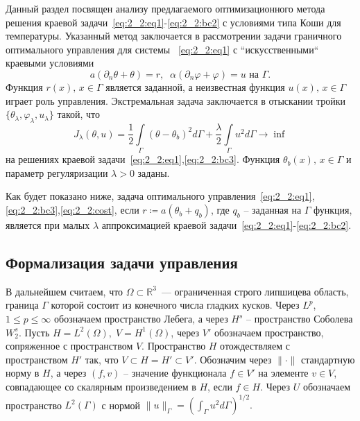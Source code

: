 Данный раздел посвящен анализу предлагаемого
оптимизационного метода решения краевой задачи~\eqref{eq:2_2:eq1}-\eqref{eq:2_2:bc2}
с условиями типа Коши для температуры.
Указанный метод заключается в рассмотрении задачи
граничного оптимального управления для
системы ~\eqref{eq:2_2:eq1} с ``искусственными`` краевыми условиями
\begin{equation}
    \label{eq:2_2:bc3}
    a(\partial_n\theta+\theta) = r,\;\;
    \alpha(\partial_n\varphi+\varphi) = u \text{ на }\Gamma.
\end{equation}
Функция $r(x),\, x\in\Gamma$ является заданной, а неизвестная функция $u(x),\, x\in\Gamma$
играет роль управления.
Экстремальная задача заключается в отыскании
тройки $\{\theta_\lambda,\varphi_\lambda,u_\lambda\}$
такой, что
\begin{equation}
    \label{eq:2_2:cost}
    J_\lambda(\theta, u) = \frac{1}{2}\int\limits_\Gamma (\theta - \theta_b)^2 d\Gamma
    + \frac{\lambda}{2}\int\limits_\Gamma u^2 d\Gamma \rightarrow\inf
\end{equation}
на решениях краевой задачи~\eqref{eq:2_2:eq1},\eqref{eq:2_2:bc3}.
Функция $\theta_b(x),\, x\in\Gamma$  и параметр регуляризации $\lambda>0$ заданы.

Как будет показано ниже, задача оптимального
управления~\eqref{eq:2_2:eq1}, \eqref{eq:2_2:bc3},\eqref{eq:2_2:cost}, если
$r \coloneqq a(\theta_b+q_b)$, где $q_b$ -- заданная на $\Gamma$ функция,
является при малых $\lambda$ аппроксимацией краевой
задачи~\eqref{eq:2_2:eq1}-\eqref{eq:2_2:bc2}.

\subsection{Формализация задачи управления}\label{subsec:ch2/sec2/subsec2}
В дальнейшем считаем, что $\Omega\subset \mathbb{R}^3$~--- ограниченная строго липшицева
область, граница $\Gamma$ которой состоит из конечного числа
гладких кусков.
Через $L^p$, $1 \leq p \leq \infty$ обозначаем
пространство Лебега, а через $H^s$ -- пространство Соболева $W^s_2$.
Пусть $H = L^2(\Omega), \; V = H^1(\Omega)$, через $V'$ обозначаем
пространство, сопряженное с пространством $V$.
Пространство $H$ отождествляем с пространством $H'$ так, что $V \subset H = H' \subset V'$.
Обозначим через $\|\cdot\|$ стандартную норму в $H$, а через
$(f,v)$ -- значение функционала $f\in V'$ на элементе $v\in V$,
совпадающее со скалярным произведением в $H$, если $f\in H$.
Через $U$ обозначаем пространство $L^2(\Gamma)$ с нормой
$\|u\|_\Gamma=\left(\int_\Gamma u^2 d\Gamma\right)^{1/2}.$



